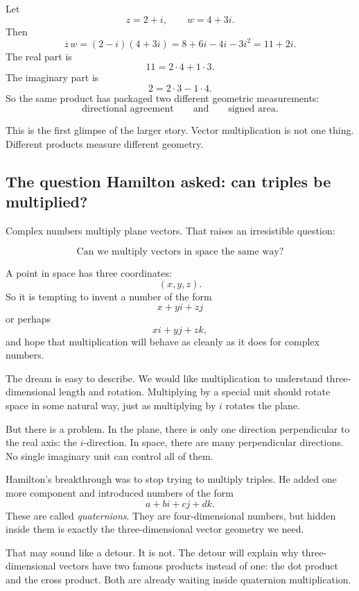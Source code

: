 \begin{example}
Let
\[
    z=2+i,\qquad w=4+3i.
\]
Then
\[
    \overline z\,w=(2-i)(4+3i)=8+6i-4i-3i^2=11+2i.
\]
The real part is
\[
    11=2\cdot4+1\cdot3.
\]
The imaginary part is
\[
    2=2\cdot3-1\cdot4.
\]
So the same product has packaged two different geometric measurements:
\[
    \text{directional agreement} \qquad \text{and} \qquad \text{signed area}.
\]
\end{example}

This is the first glimpse of the larger story.  Vector multiplication is not one thing.
Different products measure different geometry.

\subsection{The question Hamilton asked: can triples be multiplied?}

Complex numbers multiply plane vectors.  That raises an irresistible question:

\[
    \text{Can we multiply vectors in space the same way?}
\]

A point in space has three coordinates:
\[
    (x,y,z).
\]
So it is tempting to invent a number of the form
\[
    x+yi+zj
\]
or perhaps
\[
    xi+yj+zk,
\]
and hope that multiplication will behave as cleanly as it does for complex numbers.

The dream is easy to describe.  We would like multiplication to understand three-dimensional
length and rotation.  Multiplying by a special unit should rotate space in some natural way,
just as multiplying by \(i\) rotates the plane.

But there is a problem.  In the plane, there is only one direction perpendicular to the real
axis: the \(i\)-direction.  In space, there are many perpendicular directions.  No single
imaginary unit can control all of them.

Hamilton's breakthrough was to stop trying to multiply triples.  He added one more
component and introduced numbers of the form
\[
    a+bi+cj+dk.
\]
These are called \emph{quaternions}.  They are four-dimensional numbers, but hidden
inside them is exactly the three-dimensional vector geometry we need.

That may sound like a detour.  It is not.  The detour will explain why three-dimensional
vectors have two famous products instead of one: the dot product and the cross product.
Both are already waiting inside quaternion multiplication.

